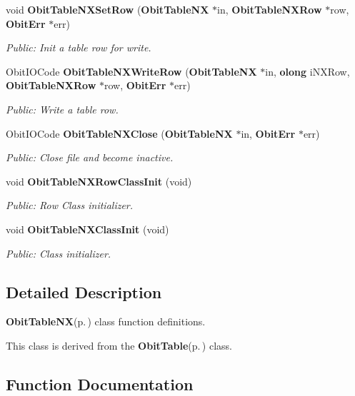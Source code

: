 \begin{CompactItemize}
void {\bf Obit\-Table\-NXSet\-Row} ({\bf Obit\-Table\-NX} $\ast$in, {\bf Obit\-Table\-NXRow} $\ast$row, {\bf Obit\-Err} $\ast$err)
\begin{CompactList}\small\item\em Public: Init a table row for write. \item\end{CompactList}\item 
Obit\-IOCode {\bf Obit\-Table\-NXWrite\-Row} ({\bf Obit\-Table\-NX} $\ast$in, {\bf olong} i\-NXRow, {\bf Obit\-Table\-NXRow} $\ast$row, {\bf Obit\-Err} $\ast$err)
\begin{CompactList}\small\item\em Public: Write a table row. \item\end{CompactList}\item 
Obit\-IOCode {\bf Obit\-Table\-NXClose} ({\bf Obit\-Table\-NX} $\ast$in, {\bf Obit\-Err} $\ast$err)
\begin{CompactList}\small\item\em Public: Close file and become inactive. \item\end{CompactList}\item 
void {\bf Obit\-Table\-NXRow\-Class\-Init} (void)
\begin{CompactList}\small\item\em Public: Row Class initializer. \item\end{CompactList}\item 
void {\bf Obit\-Table\-NXClass\-Init} (void)
\begin{CompactList}\small\item\em Public: Class initializer. \item\end{CompactList}\end{CompactItemize}


\subsection{Detailed Description}
{\bf Obit\-Table\-NX}{\rm (p.\,\pageref{structObitTableNX})} class function definitions. 

This class is derived from the {\bf Obit\-Table}{\rm (p.\,\pageref{structObitTable})} class.

\subsection{Function Documentation}
